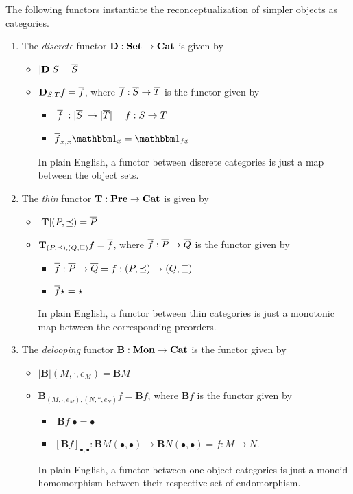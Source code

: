 \begin{ex} The following functors instantiate the reconceptualization of simpler objects as categories.

\begin{enumerate}
\item The \emph{discrete} functor $\mathbf{D}:\mathbf{Set}\to\mathbf{Cat}$ is given by
\begin{itemize}
\item $|\mathbf{D}|S = \overline{S}$
\item $\mathbf{D}_{S,T}f=\overline{f}$, where $\overline{f}:\overline{S}\to\overline{T}$ is the functor given by
\begin{itemize}
\item $|\overline{f}|:|\overline{S}|\to|\overline{T}|=f:S\to T$
\item $\ol{f}_{x,x}\Id{x}=\Id{fx}$ 
\end{itemize}
In plain English, a functor between discrete categories is just a map between the object sets.
\end{itemize}
\item The \emph{thin} functor $\mathbf{T}:\mathbf{Pre}\to\mathbf{Cat}$ is given by
\begin{itemize}
\item $|\mathbf{T}|(P,\preceq) = \overline{P}$
\item $\mathbf{T}_{(P,\preceq),(Q,\sqsubseteq)}f=\overline{f}$, where $\overline{f}:\overline{P}\to\overline{Q}$ is the functor given by
\begin{itemize}
\item $\overline{f}:\overline{P}\to\overline{Q} = f:(P,\preceq)\to (Q,\sqsubseteq)$
\item $\overline{f}\star = \star$
\end{itemize}
In plain English, a functor between thin categories is just a monotonic map between the corresponding preorders. 
\end{itemize}
\item The \emph{delooping} functor $\mathbf{B}:\mathbf{Mon}\to\mathbf{Cat}$ is the functor given by
\begin{itemize} 
\item $|\mathbf{B}|(M,\cdot,e_M)=\mathbf{B}M$
\item $\mathbf{B}_{(M,\cdot,e_M),(N,*,e_N)}f = \mathbf{B}f$, where $\mathbf{B}f$ is the functor given by 
\begin{itemize}
\item $|\mathbf{B}f|\bullet = \bullet$
\item $[\mathbf{B}f]_{\bullet,\bullet}:\mathbf{B}M(\bullet,\bullet)\to\mathbf{B}N(\bullet,\bullet)=f:M\to N$.
\end{itemize}
In plain English, a functor between one-object categories is just a monoid homomorphism between their respective set of endomorphism.
\end{itemize}
\end{enumerate}

\end{ex}

